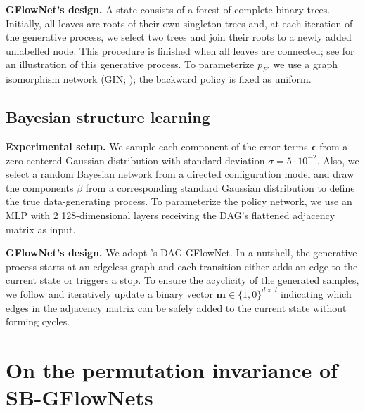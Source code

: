 \documentclass{article}
\newcommand{\pp}[1]{\vspace{0pt}\noindent\textbf{#1}}
\theoremstyle{plain}
\theoremstyle{definition}
\theoremstyle{remark}
\theoremstyle{remark}
\begin{document}
\pp{GFlowNet's design.} A state consists of a forest of complete binary trees. Initially, all leaves are roots of their own singleton trees and, at each iteration of the generative process, we select two trees and join their roots to a newly added unlabelled node. This procedure is finished when all leaves are connected; see \cite[Figure 1]{zhou2024phylogfn} for an illustration of this generative process. To parameterize $p_{F}$, we use a graph isomorphism network (GIN; \cite{xu2018powerful}); the backward policy is fixed as uniform. 

\subsection{Bayesian structure learning} 

\pp{Experimental setup.} We sample each component of the error terms $\boldsymbol{\epsilon}$ from a zero-centered Gaussian distribution with standard deviation $\sigma = 5 \cdot 10^{-2}$. Also, we select a random Bayesian network from a directed configuration model \cite{newman} and draw the components $\beta$ from a corresponding standard Gaussian distribution to define the true data-generating process. 
To parameterize the policy network, we use an MLP with 2 128-dimensional layers receiving the DAG's flattened adjacency matrix as input. 

\pp{GFlowNet's design.} We adopt \citet{deleu2022bayesian}'s DAG-GFlowNet. 
In a nutshell, the generative process starts at an edgeless graph and each transition either adds an edge to the current state or triggers a stop. 
To ensure the acyclicity of the generated samples, we follow \cite[Appendix C]{deleu2022bayesian} and iteratively update a binary vector $\mathbf{m} \in \{1, 0\}^{d \times d}$ indicating which edges in the adjacency matrix can be safely added to the current state without forming cycles.  

\section{On the permutation invariance of SB-GFlowNets}
\end{document}
